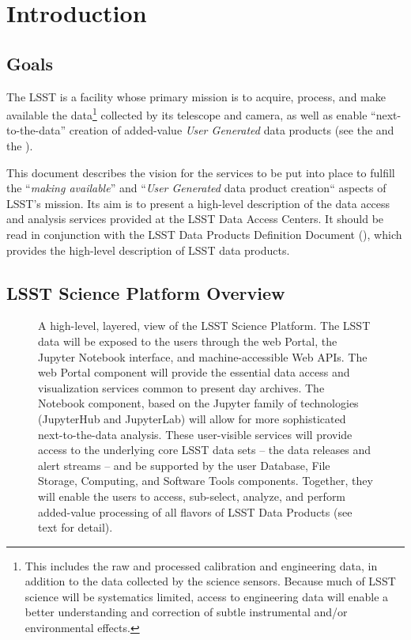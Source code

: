 \section{Introduction\label{sec:intro}}

\subsection{Goals}

The LSST is a facility whose primary mission is to acquire, process, and
make available the data\footnote{This includes the raw and processed calibration and engineering data, in addition to the data collected by the science sensors. 
Because much of LSST science will be systematics limited, access to engineering data will enable a better understanding and correction of subtle instrumental and/or environmental effects.} collected by its telescope and camera, as well as enable ``next-to-the-data'' creation of added-value \textit{User Generated} data products (see the \SRD and the \LSR).

This document describes the vision for the services to be put into place to
fulfill the ``\emph{making available}'' and ``\emph{User Generated} data product creation``
aspects of LSST's mission. Its aim is to present a high-level
description of the data access and analysis services provided at the
LSST Data Access Centers. It should be read in conjunction with the
LSST Data Products Definition Document (\DPDD), which provides the high-level
description of LSST data products.

\subsection{LSST Science Platform Overview}

\begin{figure}
\centering
{}
\caption{
A high-level, layered, view of the LSST Science Platform.  The LSST data
will be exposed to the users through the web Portal, the Jupyter Notebook
interface, and machine-accessible Web APIs.  The web Portal component will
provide the essential data access and visualization services common to
present day archives.  The Notebook component, based on the Jupyter family
of technologies (JupyterHub and JupyterLab) will allow for more
sophisticated next-to-the-data analysis.  These user-visible services will
provide access to the underlying core LSST data sets -- the data releases and
alert streams -- and be supported by the user Database, File Storage,
Computing, and Software Tools components.  Together, they will enable the
users to access, sub-select, analyze, and perform added-value processing of
all flavors of LSST Data Products (see text for detail).
\label{fig:layeredLSP}}
\end{figure}

